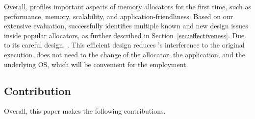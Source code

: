 
Overall, \MP{} profiles important aspects of memory allocators for the first time, such as performance, memory, scalability, and application-friendliness. Based on our extensive evaluation, \MP{} successfully identifies multiple known and new design issues inside popular allocators, as further described in Section~\ref{sec:effectiveness}. Due to its careful design, . This efficient design reduces \MP{}'s interference to the original execution. \MP{} does not need to the change of the allocator, the application, and the underlying OS, which will be convenient for the employment. 


\subsection*{Contribution}

Overall, this paper makes the following contributions. 

